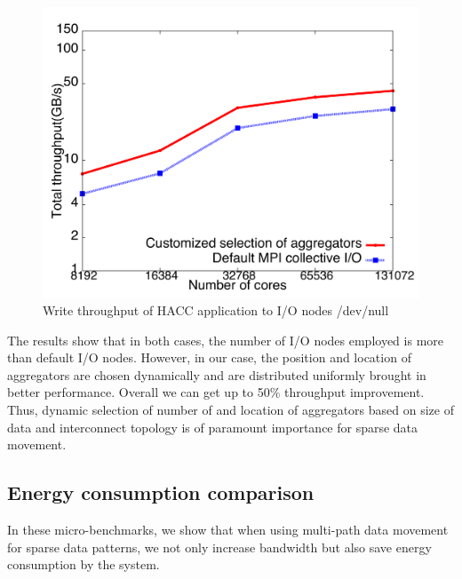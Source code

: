 \begin{figure}[!htb]
\vspace{-0.1in}
\centering
\includegraphics[scale=0.3]{figures/hacc_agg.pdf}
\vspace{-0.1in}
\caption{Write throughput of HACC application to I/O nodes /dev/null}
\vspace{-0.1in}
\label{fig:hacc_agg}
\end{figure}

The results show that in both cases, the number of I/O nodes employed is more than default I/O nodes. However, in our case, the position and location of aggregators are chosen dynamically and are distributed uniformly brought in better performance. Overall we can get up to 50\% throughput improvement. Thus, dynamic selection of number of and location of aggregators based on size of data and interconnect topology is of paramount importance for sparse data movement.

\subsection{Energy consumption comparison}
In these micro-benchmarks, we show that when using multi-path data movement for sparse data patterns, we not only increase bandwidth but also save energy consumption by the system.


